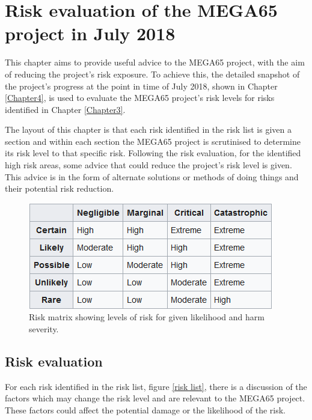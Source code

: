 
\chapter{Risk evaluation of the MEGA65 project in July 2018}
\label{Chapter5}
This chapter aims to provide useful advice to the MEGA65 project, with the aim of reducing the project's risk exposure. To achieve this, the detailed snapshot of the project's progress at the point in time of July 2018, shown in Chapter \ref{Chapter4}, is used to evaluate the MEGA65 project's risk levels for risks identified in Chapter \ref{Chapter3}. 

The layout of this chapter is that each risk identified in the risk list is given a section and within each section the MEGA65 project is scrutinised to determine its risk level to that specific risk. Following the risk evaluation, for the identified high risk areas, some advice that could reduce the project's risk level is given. This advice is in the form of alternate solutions or methods of doing things and their potential risk reduction. 

\begin{figure} \begin{center}
\includegraphics[width=.5\linewidth]{pics/riskmatrix} 
\end{center} 
\caption{Risk matrix showing levels of risk for given likelihood and harm severity.\\}
\label{riskmatrix}
\end{figure}

\section{Risk evaluation}
\label{evaluation 18}
For each risk identified in the risk list, figure \ref{risk list}, there is a discussion of the factors which may change the risk level and are relevant to the MEGA65 project. These factors could affect the potential damage or the likelihood of the risk.

